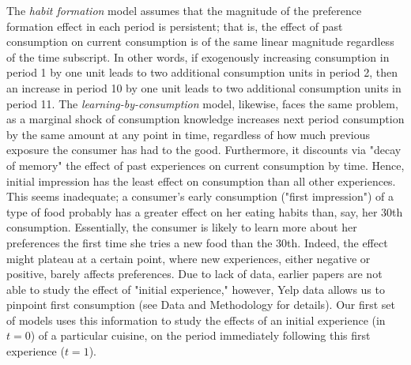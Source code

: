 \documentclass[Journal,letterpaper, NoLineNumbers]{ascelike-new}
\begin{document}
The \textit{habit formation} model assumes that the magnitude of the preference formation effect in each period is persistent; that is, the effect of past consumption on current consumption is of the same linear magnitude regardless of the time subscript. In other words, if exogenously increasing consumption in period 1 by one unit leads to two additional consumption units in period 2, then an increase in period 10 by one unit leads to two additional consumption units in period 11. The \textit{learning-by-consumption} model, likewise, faces the same problem, as a marginal shock of consumption knowledge increases next period consumption by the same amount at any point in time, regardless of how much previous exposure the consumer has had to the good. Furthermore, it discounts via "decay of memory" the effect of past experiences on current consumption by time. Hence, initial impression has the least effect on consumption than all other experiences. This seems inadequate; a consumer's early consumption ("first impression") of a type of food probably has a greater effect on her eating habits than, say, her 30th consumption. Essentially, the consumer is likely to learn more about her preferences the first time she tries a new food than the 30th. Indeed, the effect might plateau at a certain point, where new experiences, either negative or positive, barely affects preferences. Due to lack of data, earlier papers are not able to study the effect of "initial experience," however, Yelp data allows us to pinpoint first consumption (see Data and Methodology for details). Our first set of models uses this information to study the effects of an initial experience (in $t=0$) of a particular cuisine, on the period immediately following this first experience ($t=1$). 
\end{document}

